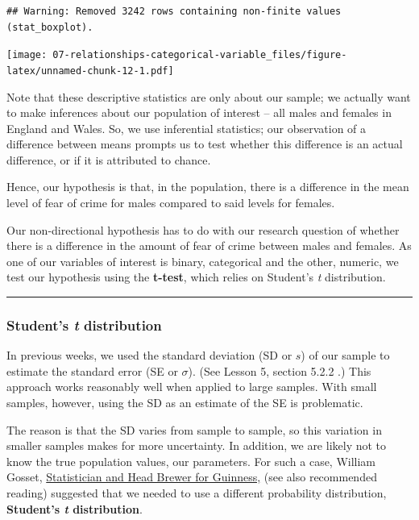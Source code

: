\documentclass[
]{book}
\begin{document}
\begin{verbatim}
## Warning: Removed 3242 rows containing non-finite values (stat_boxplot).
\end{verbatim}

\texttt{[image: 07-relationships-categorical-variable\_files/figure-latex/unnamed-chunk-12-1.pdf]}

Note that these descriptive statistics are only about our sample; we actually want to make inferences about our population of interest -- all males and females in England and Wales. So, we use inferential statistics; our observation of a difference between means prompts us to test whether this difference is an actual difference, or if it is attributed to chance.

Hence, our hypothesis is that, in the population, there is a difference in the mean level of fear of crime for males compared to said levels for females.

Our non-directional hypothesis has to do with our research question of whether there is a difference in the amount of fear of crime between males and females. As one of our variables of interest is binary, categorical and the other, numeric, we test our hypothesis using the \textbf{t-test}, which relies on Student's \emph{t} distribution.

\begin{center}\rule{0.5\linewidth}{0.5pt}\end{center}

\hypertarget{students-t-distribution}{%
\subsubsection{\texorpdfstring{Student's \emph{t} distribution}{Student's t distribution}}\label{students-t-distribution}}

In previous weeks, we used the standard deviation (SD or \(s\)) of our sample to estimate the standard error (SE or \(\sigma\)). (See Lesson 5, section 5.2.2 .) This approach works reasonably well when applied to large samples. With small samples, however, using the SD as an estimate of the SE is problematic.

The reason is that the SD varies from sample to sample, so this variation in smaller samples makes for more uncertainty. In addition, we are likely not to know the true population values, our parameters. For such a case, William Gosset, \href{https://mathshistory.st-andrews.ac.uk/Biographies/Gosset/}{Statistician and Head Brewer for Guinness,} (see also recommended reading) suggested that we needed to use a different probability distribution, \textbf{Student's \emph{t} distribution}.
\end{document}
